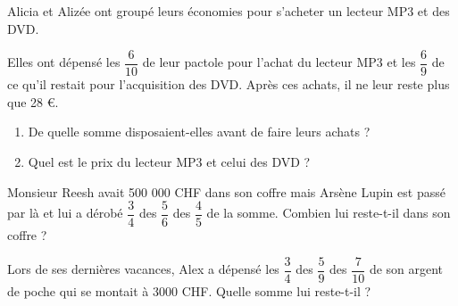 \begin{exercice}
Alicia et Alizée ont groupé leurs économies pour s’acheter un lecteur MP3 et des DVD. 

Elles ont dépensé les $\dfrac{6}{10}$ de leur pactole pour l'achat du lecteur MP3 et les $\dfrac{6}{9}$ de ce qu'il restait pour l’acquisition des DVD. Après ces achats, il ne leur reste plus que 28 €.
\begin{enumerate}
\item De quelle somme disposaient-elles avant de faire leurs achats ? 
\item Quel est le prix du lecteur MP3 et celui des DVD ?
\end{enumerate}
\end{exercice}


\begin{exercice}
Monsieur Reesh avait 500 000 CHF dans son coffre mais Arsène Lupin est passé par là et lui a dérobé $\dfrac{3}{4}$ des $\dfrac{5}{6}$ des $\dfrac{4}{5}$ de la somme. Combien lui reste-t-il dans son coffre ?
\end{exercice}


\begin{exercice}
Lors de ses dernières vacances, Alex a dépensé les $\dfrac{3}{4}$ des $\dfrac{5}{9}$ des $\dfrac{7}{10}$ de son argent de poche qui se montait à 3000 CHF. Quelle somme lui reste-t-il ?
\end{exercice}

